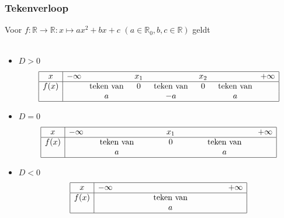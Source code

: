 \begin{frame}
\frametitle{Tekenverloop}
\pause
Voor $f:\mathbb{R}\rightarrow \mathbb{R}:x\mapsto ax^2+bx+c$ $(a \in \mathbb{R}_0, b,c\in \mathbb{R})$ geldt
\\~\\
\begin{itemize}
\item $D>0$
      \[\begin{array}{|c|ccccccc|}
        \hline
        x&-\infty& &~x_1~& &~x_2~& &+\infty\\
        \hline
        f(x)& &\mbox{teken van}&0&\mbox{teken van}&0&\mbox{teken van}&\\
            & & a               && -a            &&a&\\
        \hline
      \end{array}\]
\item $D=0$
      \[\begin{array}{|c|ccccc|}
        \hline
        x&-\infty& &~~~~~~x_1~~~~~~ & &+\infty\\
        \hline
        f(x)& &~~~\mbox{teken van}~~~&0&~~~\mbox{teken van}~~~&\\
            & & a               & &a&\\
        \hline
      \end{array}\]
\item $D<0$
      \[\begin{array}{|c|ccc|}
        \hline
        x&-\infty&  &+\infty\\
        \hline
        f(x)& &~~~~~~~~~~~~\mbox{teken van}~~~~~~~~~~~~&\\
            & & a               &\\
        \hline
      \end{array}\]
\end{itemize}\end{frame}


